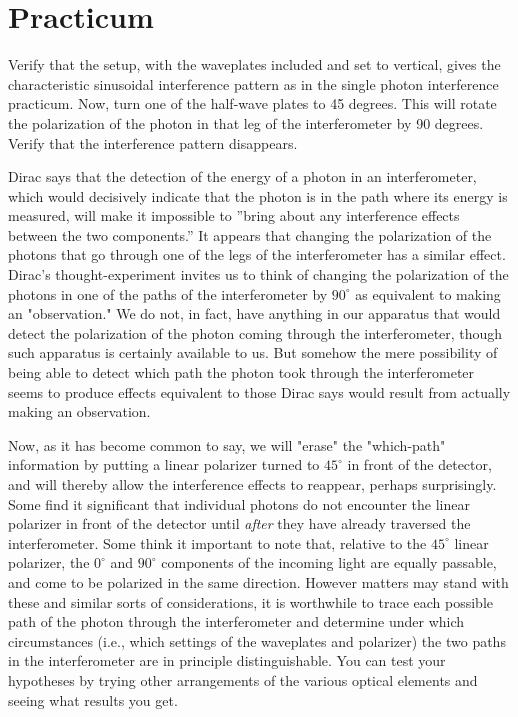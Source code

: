 \section*{Practicum}

Verify that the setup, with the waveplates included and set to vertical, gives the characteristic sinusoidal interference pattern as in the single photon interference practicum.  Now, turn one of the half-wave plates to 45 degrees.  This will rotate the polarization of the photon in that leg of the interferometer by 90 degrees.  Verify that the interference pattern disappears.

Dirac says that the detection of the energy of a photon in an interferometer, which would decisively indicate that the photon is in the path where its energy is measured, will make it impossible to ''bring about any interference effects between the two components.'' It appears that changing the polarization of the photons that go through one of the legs of the interferometer has a similar effect.  Dirac's thought-experiment invites us to think of changing the polarization of the photons in one of the paths of the interferometer by $90^\circ$ as equivalent to making an "observation." We do not, in fact, have anything in our apparatus that would detect the polarization of the photon coming through the interferometer, though such apparatus is certainly available to us.  But somehow the mere possibility of being able to detect which path the photon took through the interferometer seems to produce effects equivalent to those Dirac says would result from actually making an observation.

Now, as it has become common to say, we will "erase" the "which-path" information by putting a linear polarizer turned to $45^\circ$ in front of the detector, and will thereby allow the interference effects to reappear, perhaps surprisingly. Some find it significant that individual photons do not encounter the linear polarizer in front of the detector until \emph{after} they have already traversed the interferometer. Some think it important to note that, relative to the $45^\circ$ linear polarizer, the $0^\circ$ and $90^\circ$ components of the incoming light are equally passable, and come to be polarized in the same direction.   However matters may stand with these and similar sorts of considerations, it is worthwhile to trace each possible path of the photon through the interferometer and determine under which circumstances (i.e., which settings of the waveplates and polarizer) the two paths in the interferometer are in principle distinguishable.  You can test your hypotheses by trying other arrangements of the various optical elements and seeing what results you get.

